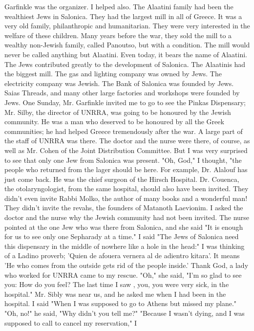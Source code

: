 Garfinkle was the organizer.
I 
helped also.
The Alaatini family had been the wealthiest Jews in Salonica.
They had the largest 
mill in all of Greece.
It was a very old family, philanthropic and humanitarian.
They 
were very interested in the welfare of these children.
Many years before the war, they 
sold the mill to a wealthy non-Jewish family, called Panoutso, but with a condition.
The mill would never be called anything but Alaatini.
Even today, it bears the name 
of Alaatini.
The Jews contributed greatly to the development of Salonica.
The Alaatinis had 
the biggest mill.
The gas and lighting company was owned by Jews.
The electricity 
company was Jewish.
The Bank of Salonica was founded by Jews.
Saias Threads, and many 
other large factories and workshops were founded by Jews.
One Sunday, Mr.
Garfinkle invited me to go to see the Pinkas Dispensary; Mr.
Silby, 
the director of UNRRA, was going to be honoured by the Jewish community.
He was a man who deserved to be honoured by all the Greek communities; he had helped Greece tremendously after the war.
A large part of the staff of UNRRA was there.
The doctor and the nurse were there, 
of course, as well as Mr.
Cohen of the Joint Distribution Committee.
But I was very 
surprised to see that only one Jew from Salonica was present.
"Oh, God," I thought, "the people who returned from the lager should be here.
For 
example, Dr.
Alalouf has just come back.
He was the chief surgeon of the Hirsch Hospital.
Dr.
Couenca, the otolaryngologist, from the same hospital, should also have 
been invited.
They didn't even invite Rabbi Molko, the author of many books and a 
wonderful man!
They didn't invite the revahs, the founders of Matanoth Laevionim.
I asked the doctor and the nurse why the Jewish community had not been invited.
The nurse pointed at the one Jew who was there from Salonica, and she said "It is
enough for us to see only one Sepharady at a time."
I said "The Jews of Salonica need this dispensary in the middle of nowhere like 
a hole in the head:" I was thinking of a Ladino proverb; 'Quien de afouera vernera 
al de adientro kitara'.
It means 'He who comes from the outside gets rid of the people 
inside.'
Thank God, a lady who worked for UNRRA came to my rescue.
"Oh," she said, "I'm so glad to see you: How do you feel?
The last time I saw , 
you, you were very sick, in the hospital."
Mr.
Sibly was near us, and he asked me when I had been in the hospital.
I said "When I was supposed to go to Athens but missed my plane."
"Oh, no!"
he said, "Why didn't you tell me?"
"Because I wasn't dying, and I was supposed to call to cancel my reservation," I
